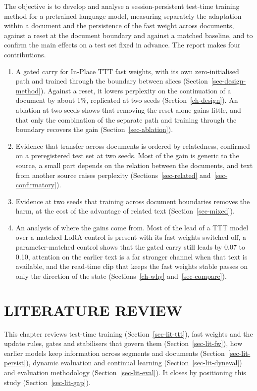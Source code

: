 \documentclass[12pt,a4paper]{report}
\begin{document}
The objective is to develop and analyse a session-persistent test-time training method for a pretrained language model, measuring separately the adaptation within a document and the persistence of the fast weight across documents, against a reset at the document boundary and against a matched baseline, and to confirm the main effects on a test set fixed in advance. The report makes four contributions.
\begin{enumerate}
  \item A gated carry for In-Place TTT fast weights, with its own zero-initialised path and trained through the boundary between slices (Section~\ref{sec-design-method}). Against a reset, it lowers perplexity on the continuation of a document by about 1\%, replicated at two seeds (Section~\ref{ch-design}). An ablation at two seeds shows that removing the reset alone gains little, and that only the combination of the separate path and training through the boundary recovers the gain (Section~\ref{sec-ablation}).
  \item Evidence that transfer across documents is ordered by relatedness, confirmed on a preregistered test set at two seeds. Most of the gain is generic to the source, a small part depends on the relation between the documents, and text from another source raises perplexity (Sections~\ref{sec-related} and~\ref{sec-confirmatory}).
  \item Evidence at two seeds that training across document boundaries removes the harm, at the cost of the advantage of related text (Section~\ref{sec-mixed}).
  \item An analysis of where the gains come from. Most of the lead of a TTT model over a matched LoRA control is present with its fast weights switched off, a parameter-matched control shows that the gated carry still leads by 0.07 to 0.10, attention on the earlier text is a far stronger channel when that text is available, and the read-time clip that keeps the fast weights stable passes on only the direction of the state (Sections~\ref{ch-why} and~\ref{sec-compare}).
\end{enumerate}

\chapter{LITERATURE REVIEW}
\label{ch-lit}

This chapter reviews test-time training (Section~\ref{sec-lit-ttt}), fast weights and the update rules, gates and stabilisers that govern them (Section~\ref{sec-lit-fw}), how earlier models keep information across segments and documents (Section~\ref{sec-lit-persist}), dynamic evaluation and continual learning (Section~\ref{sec-lit-dyneval}) and evaluation methodology (Section~\ref{sec-lit-eval}). It closes by positioning this study (Section~\ref{sec-lit-gap}).
\end{document}
